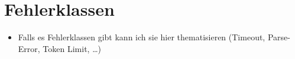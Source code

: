 \section{Fehlerklassen}\label{sec:fehlerklassen}

\begin{itemize}
    \item Falls es Fehlerklassen gibt kann ich sie hier thematisieren (Timeout, Parse-Error, Token Limit, \ldots)
\end{itemize}